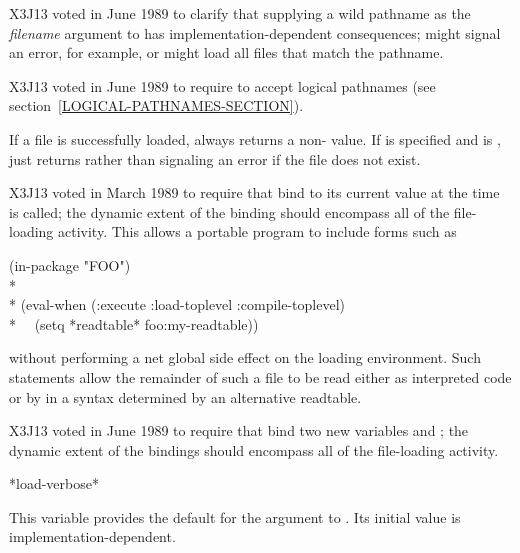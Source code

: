\begin{defun}[Function]
\begin{newer}
X3J13 voted in June 1989 
to clarify that supplying a wild pathname
as the \emph{filename} argument to  has implementation-dependent consequences;
 might signal an error, for example,
or might load all files that match the pathname.
\end{newer}

\begin{newer}
X3J13 voted in June 1989  to require 
to accept logical pathnames (see section~\ref{LOGICAL-PATHNAMES-SECTION}).
\end{newer}

If a file is successfully loaded,  always returns a non-{\false}
value.  If  is specified and is {\false},
 just returns {\false} rather than signaling an error if the file
does not exist.

\begin{newer}
X3J13 voted in March 1989 
to require that  bind  to its current value
at the time  is called; the dynamic extent of the binding
should encompass all of the file-loading activity.
This allows a portable program to include forms such as
\begin{lisp}
(in-package "FOO") \\*
\\*
(eval-when (:execute :load-toplevel :compile-toplevel) \\*
~~(setq *readtable* foo:my-readtable))
\end{lisp}
without performing a net global side effect on the loading environment.
Such statements allow the remainder of such a file to be read either as
interpreted code or by  in a syntax determined by
an alternative readtable.
\end{newer}

\begin{newer}
X3J13 voted in June 1989 
to require that  bind two new variables
 and ; the dynamic extent of the bindings
should encompass all of the file-loading activity.
\end{newer}
\end{defun}

\begin{defun}[Variable]
*load-verbose*

This variable provides the default for the  argument
to .  Its initial value is implementation-dependent.
\end{defun}


